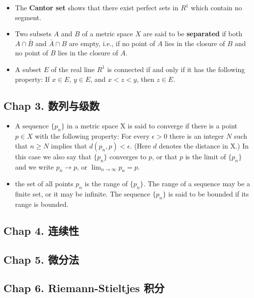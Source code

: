 \begin{itemize}
\item The \textbf{Cantor set} shows that there exist perfect sets in $R^1$ which contain no segment.

\item Two subsets $A$ and $B$ of a metric space $X$ are said to be \textbf{separated} if both $A \cap \bar B$ and $\bar A \cap B$ are empty, i.e., if no point of $A$ lies in the closure of $B$ and no point of $B$ lies in the closure of $A$.

\item A subset $E$ of the real line $R^1$ is connected if and only if it has the following property:  If $x \in E$, $y \in E$, and $x < z < y$, then $z \in E$.
\end{itemize}

\subsection{Chap 3. 数列与级数}
\begin{itemize}
\item A sequence $\{p_n\}$ in a metric space X is said to converge if there is a point $p \in X$ with the following property: For every $\epsilon > 0$ there is an integer $N$ such that $n \geqslant N$ implies that $d(p_n, p) < \epsilon$. (Here $d$ denotes the distance in X.) In this case we also say that $\{p_n\}$ converges to $p$, or that $p$ is the limit of $\{p_n\}$ and we write $p_n \to p$, or $\lim_{n\to \infty} p_n = p$.
\item the set of all points $p_n$ is the range of $\{p_n\}$. The range of a sequence may be a finite set, or it may be infinite. The sequence $\{p_n\}$ is said to be bounded if its range is bounded.
\end{itemize}


\subsection{Chap 4. 连续性}

\subsection{Chap 5. 微分法}

\subsection{Chap 6. Riemann-Stieltjes 积分}

